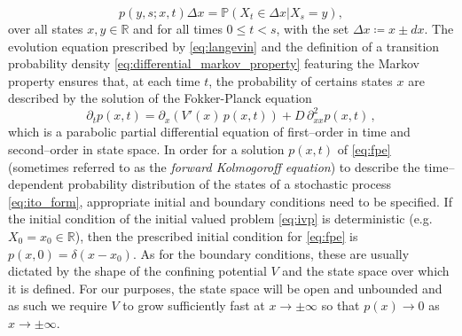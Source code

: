 %
\begin{equation}\label{eq:differential_markov_property}
  p(y,s; x,t)\Delta x = \mathbb{P}(X_t\in\Delta x | X_s = y),
\end{equation}
%
over all states $x,y\in \mathbb{R}$ and for all times $0\leq t<s$, with the set $\Delta x \coloneqq x\pm dx$.
The evolution equation prescribed by \eqref{eq:langevin} and the definition of a transition probability density \eqref{eq:differential_markov_property} featuring the Markov property ensures that, at each time $t$, the probability of certains states $x$ are described by the solution of the Fokker-Planck equation
%
\begin{equation}\label{eq:fpe}
  \partial_{t}p(x,t) = \partial_{x}(V'(x)\,p(x,t)) + D\,\partial_{xx}^{2}p(x,t)\,,
\end{equation}
%
which is a parabolic partial differential equation of first--order in time and second--order in state space.
In order for a solution $p(x,t)$ of \eqref{eq:fpe} (sometimes referred to as the \emph{forward Kolmogoroff equation}) to describe the time--dependent probability distribution of the states of a stochastic process \eqref{eq:ito_form}, appropriate initial and boundary conditions need to be specified.
If the initial condition of the initial valued problem \eqref{eq:ivp} is deterministic (e.g. $X_0 = x_0\in \mathbb{R}$), then the prescribed initial condition for \eqref{eq:fpe} is $p(x,0) = \delta(x-x_0)$.
As for the boundary conditions, these are usually dictated by the shape of the confining potential $V$ and the state space over which it is defined.
For our purposes, the state space will be open and unbounded and as such we require $V$ to grow sufficiently fast at $x\to\pm\infty$ so that $p(x)\to 0$ as $x\to\pm\infty$.


